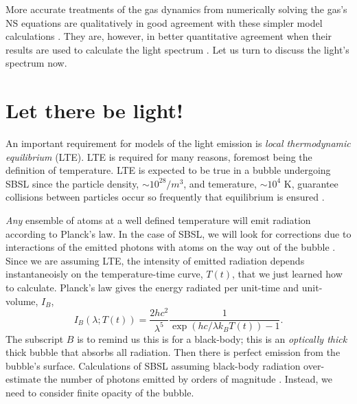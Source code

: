 \documentclass[prb,aps,nofootinbib,superscriptaddress,floatfix]{revtex4-2}
\begin{document}
More accurate treatments of the gas dynamics from numerically solving the gas's NS equations are qualitatively in good agreement with these simpler model calculations \cite{brenner2002single,yasui2018acoustic}. They are, however, in better quantitative agreement when their results are used to calculate the light spectrum \cite{an2009diagnosing,an2008spectral,an2006mechanism,flannigan2005plasma,flannigan2006measurement,suslick2008inside}. Let us turn to discuss the light's spectrum now.

\section{Let there be light!}
An important requirement for models of the light emission is \emph{local thermodynamic equilibrium} (LTE). LTE is required for many reasons, foremost being the definition of temperature. LTE is expected to be true in a bubble undergoing SBSL since the particle density, $\sim 10^{28}/m^3$, and temerature, $\sim 10^4$ K, guarantee collisions between particles occur so frequently that equilibrium is ensured \cite{brenner2002single,hilgenfeldt1999sonoluminescence,yasui1999mechanism}.

\emph{Any} ensemble of atoms at a well defined temperature will emit radiation according to Planck's law. In the case of SBSL, we will look for corrections due to interactions of the emitted photons with atoms on the way out of the bubble \cite{hilgenfeldt1999sonoluminescence}. Since we are assuming LTE, the intensity of emitted radiation depends instantaneoisly on the temperature-time curve, $T(t)$, that we just learned how to calculate. Planck's law gives the energy radiated per unit-time and unit-volume, $I_B$, \cite{schroeder1999introduction}
\begin{equation}
    I_{B}(\lambda;T(t))=\frac{2 h c^2}{\lambda^5}\frac{1}{\exp(hc/\lambda k_B T(t))-1}.
\end{equation}
The subscript $B$ is to remind us this is for a black-body; this is an \emph{optically thick} thick bubble that absorbs all radiation. Then there is perfect emission from the bubble's surface. Calculations of SBSL assuming black-body radiation over-estimate the number of photons emitted by orders of magnitude \cite{hilgenfeldt1999simple,brenner2002single}. Instead, we need to consider finite opacity of the bubble.
\end{document}
